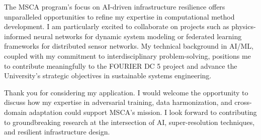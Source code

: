 \documentclass[11pt,a4paper, final]{moderncv}
\begin{document}
The MSCA program's focus on AI-driven infrastructure resilience offers unparalleled opportunities to refine my expertise in computational method development. 
I am particularly excited to collaborate on projects such as physics-informed neural networks for dynamic system modeling or federated learning frameworks for distributed sensor networks. 
My technical background in AI/ML, coupled with my commitment to interdisciplinary problem-solving, positions me to contribute meaningfully to the FOURIER DC 5 project and advance the University's strategic objectives in sustainable systems engineering.

Thank you for considering my application. 
I would welcome the opportunity to discuss how my expertise in adversarial training, data harmonization, and cross-domain adaptation could support MSCA's mission. 
I look forward to contributing to groundbreaking research at the intersection of AI, super-resolution techniques, and resilient infrastructure design.

\makeletterclosing
\end{document}
